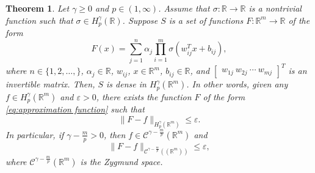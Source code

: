 \documentclass[10pt,a4paper]{amsart}
\newtheorem{theorem}{Theorem}
\newcommand\bR{\mathbb{R}}
\newcommand\cC{\mathcal{C}}
\newcommand\ep{\varepsilon}
\begin{document}
\begin{theorem}
\label{main theorem}
Let $\gamma\geq0$ and $p\in (1,\infty)$. Assume that $\sigma:\bR \to \bR$ is a nontrivial function such that $\sigma\in H_{p}^{\gamma}(\bR)$. Suppose $S$ is a set of functions $F:\bR^{m}\to \bR$ of the form
\begin{equation}
\label{eq:approximation function}
F(x) = \sum_{j = 1}^{n}\alpha_{j} \prod_{i = 1}^{m}\sigma\left( w^{T}_{ij} x + b_{ij} \right),
\end{equation}
where 
$n\in \{1,2,\dots,\}$, $\alpha_{j}\in\bR$,  $w_{ij}$, $x\in \bR^{m}$, $b_{ij}\in \bR$, and $
\begin{bmatrix}
w_{1j}~w_{2j}~\cdots~w_{mj}
\end{bmatrix}^{T}$
is an invertible matrix. Then, $S$ is dense in $H_p^{\gamma}(\bR^{m})$. In other words, given any $f\in H^{\gamma}_p(\bR^{m})$ and $\ep>0$, there exists the function $F$ of the form \eqref{eq:approximation function} such that
\begin{equation*}
\| F - f \|_{H_p^{\gamma}(\bR^{m})} \leq \ep.
\end{equation*}
In particular, if $\gamma - \frac{m}{p} >0 $, then $f\in \cC^{\gamma-\frac{m}{p}}(\bR^{m})$ and
\begin{equation*}
\| F - f \|_{\cC^{\gamma-\frac{m}{p}}((\bR^{m}))} \leq \ep,
\end{equation*}
where $\cC^{\gamma-\frac{m}{p}}(\bR^{m})$ is the Zygmund space.
\end{theorem}
\end{document}
